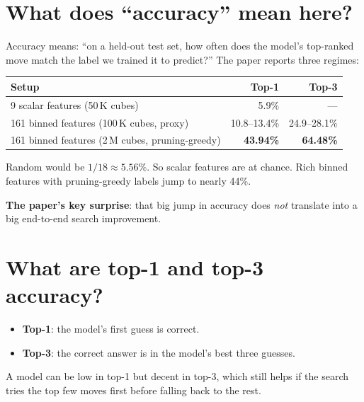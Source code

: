 \documentclass[11pt,a4paper]{article}
\newcommand{\defn}[1]{\textbf{#1}}
\begin{document}
\section{What does ``accuracy'' mean here?}

Accuracy means: ``on a held-out test set, how often does the model's
top-ranked move match the label we trained it to predict?'' The paper
reports three regimes:

\begin{center}
\begin{tabular}{@{}lrr@{}}
\toprule
\textbf{Setup} & \textbf{Top-1} & \textbf{Top-3} \\
\midrule
9 scalar features (50\,K cubes)           & 5.9\%   & ---     \\
161 binned features (100\,K cubes, proxy) & 10.8--13.4\% & 24.9--28.1\% \\
161 binned features (2\,M cubes, pruning-greedy) & \textbf{43.94\%} & \textbf{64.48\%} \\
\bottomrule
\end{tabular}
\end{center}

Random would be $1/18 \approx 5.56\%$. So scalar features are at chance.
Rich binned features with pruning-greedy labels jump to nearly
44\%.

\textbf{The paper's key surprise}: that big jump in accuracy does
\emph{not} translate into a big end-to-end search improvement.

\section{What are top-1 and top-3 accuracy?}

\begin{itemize}[leftmargin=2em]
  \item \defn{Top-1}: the model's first guess is correct.
  \item \defn{Top-3}: the correct answer is in the model's best three
        guesses.
\end{itemize}

A model can be low in top-1 but decent in top-3, which still helps
if the search tries the top few moves first before falling back to the
rest.
\end{document}
